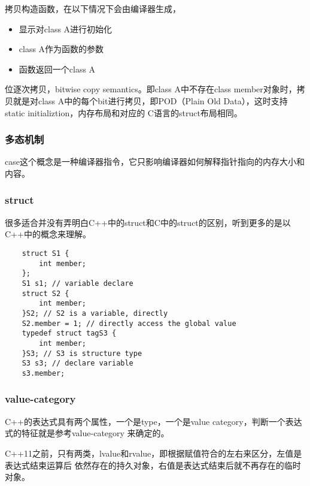 拷贝构造函数，在以下情况下会由编译器生成，
\begin{itemize}
    \item {显示对class A进行初始化}
    \item {class A作为函数的参数}
    \item {函数返回一个class A}
\end{itemize}
位逐次拷贝，bitwise copy semantics。即class A中不存在class member对象时，拷贝就是对class
A中的每个bit进行拷贝，即POD（Plain Old Data），这时支持static initializtion，内存布局和对应的
C语言的struct布局相同。

\subsubsection{多态机制}
case这个概念是一种编译器指令，它只影响编译器如何解释指针指向的内存大小和内容。

\subsubsection{struct}
很多适合并没有弄明白C++中的struct和C中的struct的区别，听到更多的是以C++中的概念来理解。
\begin{lstlisting}
    struct S1 {
        int member;
    };
    S1 s1; // variable declare
    struct S2 {
        int member;
    }S2; // S2 is a variable, directly
    S2.member = 1; // directly access the global value
    typedef struct tagS3 {
        int member;
    }S3; // S3 is structure type
    S3 s3; // declare variable 
    s3.member; 
\end{lstlisting}

\subsubsection{value-category}
C++的表达式具有两个属性，一个是type，一个是value category，判断一个表达式的特征就是参考value-category
来确定的。

C++11之前，只有两类，lvalue和rvalue，即根据赋值符合的左右来区分，左值是表达式结束运算后
依然存在的持久对象，右值是表达式结束后就不再存在的临时对象。

